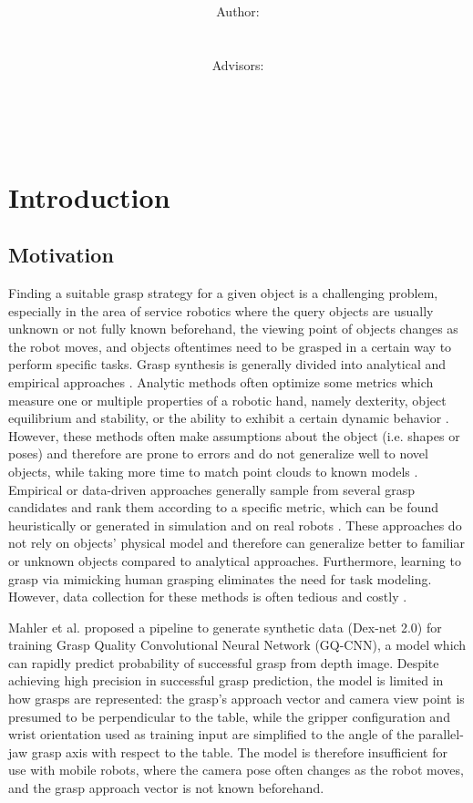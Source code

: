 \documentclass[12pt]{article}
\title{\normalsize \textsc{\hmwkAuthorSchool}   %
    \\[2.0cm]                                   %
    \HRule{0.5pt} \\                            %
    \LARGE \textbf{\uppercase{\hmwkTopic}}
    \HRule{2pt} \\ [0.5cm]                      %
    \hmwkTitle\\[0.5cm]
    \normalsize \hmwkDueDate\\
}
\author{
    \\[4.0cm]
    Author:\\
    \hmwkAuthorName\\
    \ \\
    Advisors:\\
    \hmwkAdvisorFirst\\
    \hmwkAdvisorSecond\\
    \hmwkAdvisorThird\\
}
\date{}
\begin{document}
    \maketitle
    \thispagestyle{firststyle}
    \newpage

\section{Introduction}

    \subsection{Motivation}
    Finding a suitable grasp strategy for a given object is a challenging problem, especially in the area of service robotics where the query objects are usually unknown or not fully known beforehand, the viewing point of objects changes as the robot moves, and objects oftentimes need to be grasped in a certain way to perform specific tasks. Grasp synthesis is generally divided into analytical and empirical approaches \cite{Bohg2014,Sahbani2012}. Analytic methods often optimize some metrics which measure one or multiple properties of a robotic hand, namely dexterity, object equilibrium and stability, or the ability to exhibit a certain dynamic behavior \cite{Bohg2014}. However, these methods often make assumptions about the object (i.e. shapes or poses) and therefore are prone to errors and do not generalize well to novel objects, while taking more time to match point clouds to known models \cite{Goldfeder2011}. Empirical or data-driven approaches generally sample from several grasp candidates and rank them according to a specific metric, which can be found heuristically or generated in simulation and on real robots \cite{Bohg2014}. These approaches do not rely on objects' physical model and therefore can generalize better to familiar or unknown objects compared to analytical approaches. Furthermore, learning to grasp via mimicking human grasping eliminates the need for task modeling. However, data collection for these methods is often tedious and costly \cite{mahler2017}.

	Mahler et al. \cite{mahler2017} proposed a pipeline to generate synthetic data (Dex-net 2.0) for training Grasp Quality Convolutional Neural Network (GQ-CNN), a model which can rapidly predict probability of successful grasp from depth image. Despite achieving high precision in successful grasp prediction, the model is limited in how grasps are represented: the grasp's approach vector and camera view point is presumed to be perpendicular to the table, while the gripper configuration and wrist orientation used as training input are simplified to the angle of the parallel-jaw grasp axis with respect to the table. The model is therefore insufficient for use with mobile robots, where the camera pose often changes as the robot moves, and the grasp approach vector is not known beforehand.
\end{document}
